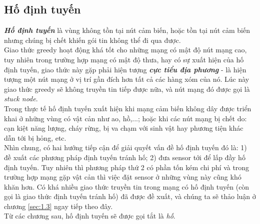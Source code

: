 \documentclass[12pt]{report}
\begin{document}
\subsection{Hố định tuyến}
\label{sec:1.2.2}
\textit{\textbf{Hố định tuyến}} là vùng không tồn tại nút cảm biến, hoặc tồn tại nút cảm biến nhưng chúng bị chết khiến gói tin không thể đi qua được.\\
Giao thức greedy hoạt động khá tốt cho những mạng có mật độ nút mạng cao, tuy nhiên trong trường hợp mạng có mật độ thưa, hay có sự xuất hiện của hố định tuyến, giao thức này gặp phải hiện tượng \textit{\textbf{cực tiểu địa phương}} - là hiện tượng một nút mạng ở vị trí gần đích hơn tất cả các hàng xóm của nó. Lúc này giao thức greedy sẽ không truyền tin tiếp được nữa, và nút mạng đó được gọi là \textit{stuck node}.\\
Trong thực tế hố định tuyến xuất hiện khi mạng cảm biến không dây được triển khai ở những vùng có vật cản như ao, hồ,...; hoặc khi các nút mạng bị chết do: cạn kiệt năng lượng, cháy rừng, bị va chạm với sinh vật hay phương tiện khác dẫn tới bị hỏng, etc.\\
Nhìn chung, có hai hướng tiếp cận để giải quyết vấn đề hố định tuyến đó là: 1) đề xuất các phương pháp định tuyến tránh hố; 2) đưa sensor tới để lấp đầy hố định tuyến. Tuy nhiên thì phương pháp thứ 2 có phần tốn kém chi phí và trong trường hợp mạng gặp vật cản thì việc đặt sensor ở những vùng này cũng khó khăn hơn. Có khá nhiều giao thức truyền tin trong mạng có hố định tuyến (còn gọi là giao thức định tuyến tránh hố) đã được đề xuất, và chúng ta sẽ thảo luận ở chương \ref{sec:1.3} ngay tiếp theo đây.\\
Từ các chương sau, hố định tuyến sẽ được gọi tắt là \textit{hố}.
\end{document}
